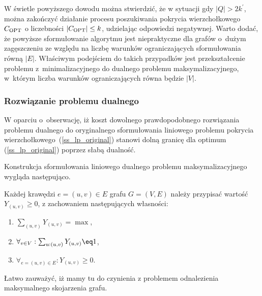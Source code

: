\par{
  W świetle powyższego dowodu można stwierdzić, że w sytuacji gdy $|Q|>2k^\prime$, można zakończyć działanie procesu poszukiwania pokrycia wierzchołkowego $C_{\textnormal{OPT}}$ o liczebności $|C_{\textnormal{OPT}}|\leq k$, udzielając odpowiedzi negatywnej.
  Warto dodać, że powyższe sformułowanie algorytmu jest niepraktyczne dla grafów o~dużym zagęszczeniu ze względu na liczbę warunków ograniczających sformułowania równą $|E|$.
  Właściwym podejściem do takich przypadków jest przekształcenie problemu z~minimalizacyjnego do dualnego problemu maksymalizacyjnego, w~którym liczba warunków ograniczających równa będzie $|V|$.
}
\subsubsection{\textbf{Rozwiązanie problemu dualnego}}

W oparciu o~obserwację, iż koszt dowolnego prawdopodobnego rozwiązania problemu
dualnego do oryginalnego sformułowania liniowego problemu pokrycia
wierzchołkowego~(\ref{ss_lp_original}) stanowi dolną granicę dla optimum
(\ref{ss_lp_original}) poprzez słabą dualność. 

Konstrukcja sformułowania liniowego dualnego problemu maksymalizacyjnego wygląda
następująco.

Każdej krawędzi $e=(u,v) \in E$ grafu $G=(V,E)$ należy przypisać wartość
$Y_(u,v) \geq 0$, z zachowaniem następujących własności:
\begin{enumerate}
  \item $\sum_{(u,v)}Y_{(u,v)} = \max$,
  \item $\forall_{v \in V}:\sum_{u:(u,v)}Y_{(u,v)}\eq 1$,
  \item $\forall_{e=(u,v) \in E}: Y_{(u,v)} \geq 0$.
\end{enumerate}

Łatwo zauważyć, iż mamy tu do czynienia z problemem odnalezienia maksymalnego
skojarzenia grafu.